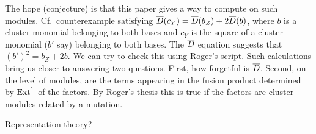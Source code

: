 \documentclass[draft]{article}
\begin{document}
The hope (conjecture) is that this paper gives a way to compute on such modules. Cf.\ counterexample satisfying $\overline{D}(c_Y) = \overline{D}(b_Z) + 2\overline{D}(b)$, where $b$ is a cluster monomial belonging to both bases and $c_Y$ is the square of a cluster monomial ($b'$ say) belonging to both bases. The $\overline{D}$ equation suggests that $(b')^2 = b_Z + 2b$. We can try to check this using Roger's script. Such calculations bring us closer to answering two questions. First, how forgetful is $\overline{D}$. Second, on the level of modules, are the terms appearing in the fusion product determined by $\operatorname{Ext}^1$ of the factors. By Roger's thesis this is true if the factors are cluster modules related by a mutation. 


Representation theory? 
\end{document}
